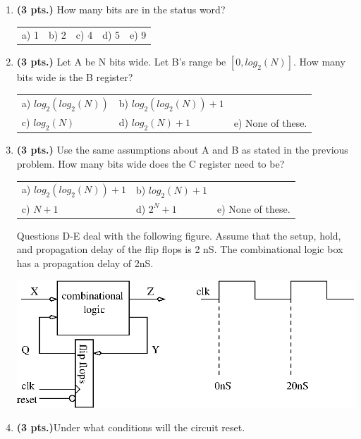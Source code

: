 \documentclass{article}
\begin{document}
\begin{enumerate}
\pagebreak
\item{\bf (3 pts.)} How many bits are in the status word?

\begin{tabular}{p{0.75in}p{0.75in}p{0.75in}p{0.75in}p{0.75in}}
a) 1 & b) 2 & c) 4 & d) 5 & e) 9 \\
\end{tabular}

\item {\bf (3 pts.)} Let A be N bits wide.  Let B's range be $[0,log_2(N)]$.
How many bits wide is the B register?

\begin{tabular}{p{1.30in}p{1.30in}p{2.00in}}
a) $log_2(log_2(N))$ & b) $log_2(log_2(N))+1$ &   \\
c) $log_2(N)$ & d) $log_2(N)+1$ & e) None of these.\\
\end{tabular}

\item {\bf (3 pts.)} Use the same assumptions about A and B as stated in the previous
problem.  How many bits wide does the C register need to be?

\begin{tabular}{p{1.30in}p{1.3in}p{2.00in}}
a) $log_2(log_2(N))+1$ & b) $log_2(N)+1$ &   \\
c) $N+1$ & d) $2^N+1$ & e) None of these.\\
\end{tabular}

Questions D-E deal with the following figure.  Assume that the
setup, hold, and propagation delay of the flip flops is 2 nS.
The combinational logic box has a propagation delay of 2nS.

\includegraphics{./Fig3/fsm.eps}

\item {\bf (3 pts.)}Under what conditions will the circuit reset.


\end{enumerate}
\end{document}
